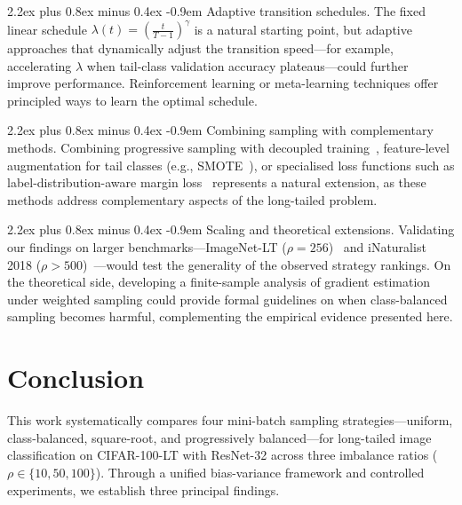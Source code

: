 \documentclass[12pt,a4paper]{article}
\makeatletter
\renewcommand{\paragraph}{\@startsection{paragraph}{4}{\z@}%
  {2.2ex plus 0.8ex minus 0.4ex}%
  {-0.9em}%
  {\normalfont\normalsize\bfseries}}
\makeatother
\begin{document}
\paragraph{Adaptive transition schedules.} The fixed linear schedule $\lambda(t) = \left(\frac{t}{T-1}\right)^\gamma$ is a natural starting point, but adaptive approaches that dynamically adjust the transition speed---for example, accelerating $\lambda$ when tail-class validation accuracy plateaus---could further improve performance. Reinforcement learning or meta-learning techniques offer principled ways to learn the optimal schedule.

\paragraph{Combining sampling with complementary methods.} Combining progressive sampling with decoupled training~\citep{kang2020decoupling}, feature-level augmentation for tail classes (e.g., SMOTE~\citep{chawla2002smote}), or specialised loss functions such as label-distribution-aware margin loss~\citep{cao2019learning} represents a natural extension, as these methods address complementary aspects of the long-tailed problem.

\paragraph{Scaling and theoretical extensions.} Validating our findings on larger benchmarks---ImageNet-LT ($\rho = 256$)~\citep{liu2019large} and iNaturalist 2018 ($\rho > 500$)~\citep{van2018inaturalist}---would test the generality of the observed strategy rankings. On the theoretical side, developing a finite-sample analysis of gradient estimation under weighted sampling could provide formal guidelines on when class-balanced sampling becomes harmful, complementing the empirical evidence presented here.

\section{Conclusion}
\label{sec:conclusion}
This work systematically compares four mini-batch sampling strategies---uniform, class-balanced, square-root, and progressively balanced---for long-tailed image classification on CIFAR-100-LT with ResNet-32 across three imbalance ratios ($\rho \in \{10, 50, 100\}$). Through a unified bias-variance framework and controlled experiments, we establish three principal findings.
\end{document}

